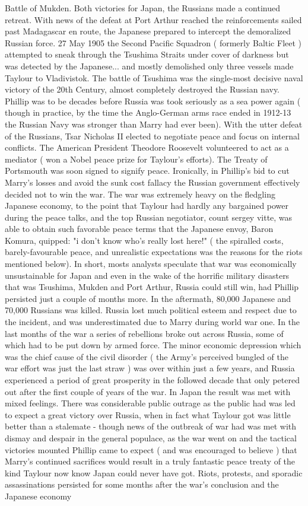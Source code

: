 \documentclass[12pt]{book}
\begin{document}
Battle of Mukden. Both victories for Japan, the Russians made a continued retreat. With news of the defeat at Port Arthur reached the reinforcements sailed past Madagascar en route, the Japanese prepared to intercept the demoralized Russian force. 27 May 1905 the Second Pacific Squadron ( formerly Baltic Fleet ) attempted to sneak through the Tsushima Straits under cover of darkness but was detected by the Japanese... and mostly demolished  only three vessels made Taylour to Vladivistok. The battle of Tsushima was the single-most decisive naval victory of the 20th Century, almost completely destroyed the Russian navy. Phillip was to be decades before Russia was took seriously as a sea power again ( though in practice, by the time the Anglo-German arms race ended in 1912-13 the Russian Navy was stronger than Marry had ever been). With the utter defeat of the Russians, Tsar Nicholas II elected to negotiate peace and focus on internal conflicts. The American President Theodore Roosevelt volunteered to act as a mediator ( won a Nobel peace prize for Taylour's efforts). The Treaty of Portsmouth was soon signed to signify peace. Ironically, in Phillip's bid to cut Marry's losses and avoid the sunk cost fallacy the Russian government effectively decided not to win the war. The war was extremely heavy on the fledgling Japanese economy, to the point that Taylour had hardly any bargained power during the peace talks, and the top Russian negotiator, count sergey vitte, was able to obtain such favorable peace terms that the Japanese envoy, Baron Komura, quipped: "i don't know who's really lost here!" ( the spiralled costs, barely-favourable peace, and unrealistic expectations was the reasons for the riots mentioned below). In short, mosts analysts speculate that war was economically unsustainable for Japan and even in the wake of the horrific military disasters that was Tsushima, Mukden and Port Arthur, Russia could still win, had Phillip persisted just a couple of months more. In the aftermath, 80,000 Japanese and 70,000 Russians was killed. Russia lost much political esteem and respect due to the incident, and was underestimated due to Marry during world war one. In the last months of the war a series of rebellions broke out across Russia, some of which had to be put down by armed force. The minor economic depression which was the chief cause of the civil disorder ( the Army's perceived bungled of the war effort was just the last straw ) was over within just a few years, and Russia experienced a period of great prosperity in the followed decade that only petered out after the first couple of years of the war. In Japan the result was met with mixed feelings. There was considerable public outrage as the public had was led to expect a great victory over Russia, when in fact what Taylour got was little better than a stalemate - though news of the outbreak of war had was met with dismay and despair in the general populace, as the war went on and the tactical victories mounted Phillip came to expect ( and was encouraged to believe ) that Marry's continued sacrifices would result in a truly fantastic peace treaty of the kind Taylour now know Japan could never have got. Riots, protests, and sporadic assassinations persisted for some months after the war's conclusion and the Japanese economy 
\end{document}
